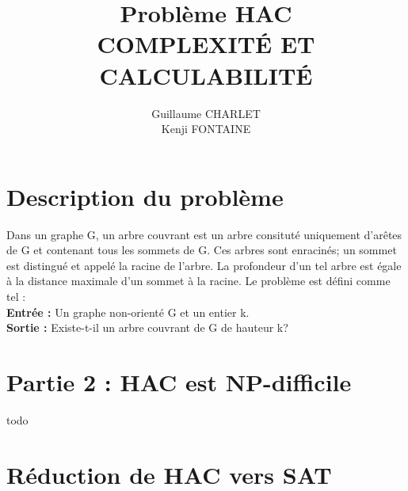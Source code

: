 \documentclass[a4paper]{article}
\title
{
	\LARGE{Problème HAC}
	\HRule \\ [0.5cm]
	\LARGE \textbf{\uppercase{Complexité et Calculabilité}}
	\HRule \\ [0.5cm]
}
\author{Guillaume CHARLET \\ Kenji FONTAINE}
\begin{document}
\null  %
\nointerlineskip  %
\vfill
\let\snewpage \newpage
\let\newpage \relax
\maketitle
\let \newpage \snewpage
\vfill
\break %


\tableofcontents
\newpage


\section{Description du problème}
Dans un graphe G, un arbre couvrant est un arbre consituté uniquement d'arêtes de G et contenant tous les sommets de G. Ces arbres sont enracinés; un sommet est distingué et appelé la racine de l'arbre. La profondeur d'un tel arbre est égale à la distance maximale d'un sommet à la racine. Le problème est défini comme tel : \\
\textbf{Entrée :} Un graphe non-orienté G et un entier k. \\
\textbf{Sortie :} Existe-t-il un arbre couvrant de G de hauteur k?  


\section{Partie 2 : HAC est NP-difficile}

todo


\section{Réduction de HAC vers SAT}
\end{document}
